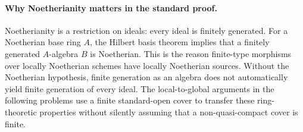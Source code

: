 \paragraph{Why Noetherianity matters in the standard proof.}
Noetherianity is a restriction on ideals: every ideal is finitely
generated.  For a Noetherian base ring \(A\), the Hilbert basis theorem
implies that a finitely generated \(A\)-algebra \(B\) is Noetherian.
This is the reason finite-type morphisms over locally Noetherian schemes
have locally Noetherian sources.
Without the Noetherian hypothesis, finite generation as an algebra
does not automatically yield finite generation of every ideal.
The local-to-global arguments in the following problems use a finite
standard-open cover to transfer these ring-theoretic properties without
silently assuming that a non-quasi-compact cover is finite.
